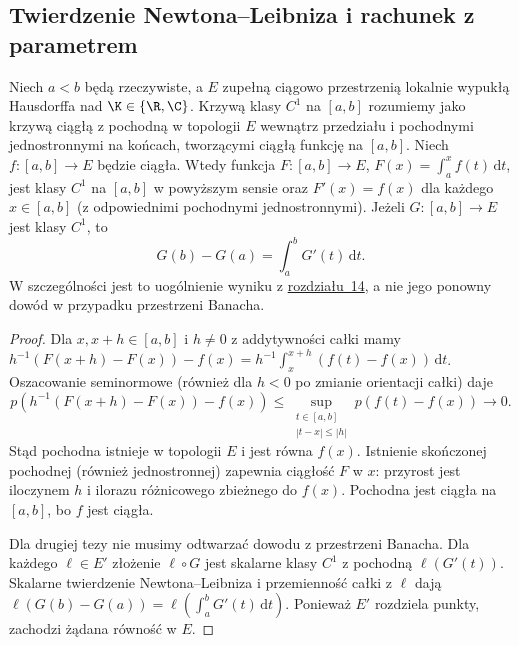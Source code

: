 \subsection{Twierdzenie Newtona--Leibniza i rachunek z parametrem}

\begin{twierdzenie}
\label{thm:ftc-lcs15a}
Niech $a<b$ będą rzeczywiste, a $E$ zupełną ciągowo
przestrzenią lokalnie wypukłą Hausdorffa nad $\K\in\{\R,\C\}$.
Krzywą klasy $C^1$ na $[a,b]$ rozumiemy jako krzywą ciągłą
z pochodną w topologii $E$ wewnątrz przedziału i pochodnymi
jednostronnymi na końcach, tworzącymi ciągłą funkcję
na $[a,b]$. Niech $f:[a,b]\to E$ będzie ciągła. Wtedy funkcja
$F:[a,b]\to E$, $F(x)=\int_a^x f(t)\,\mathrm dt$, jest klasy
$C^1$ na $[a,b]$ w powyższym sensie oraz
$F'(x)=f(x)$ dla każdego $x\in[a,b]$ (z odpowiednimi
pochodnymi jednostronnymi).
Jeżeli $G:[a,b]\to E$ jest klasy $C^1$, to
\[
 G(b)-G(a)=\int_a^b G'(t)\,\mathrm dt.
\]
W szczególności jest to uogólnienie wyniku z \hyperref[sec:gateaux-frechet14]{rozdziału~14},
a nie jego ponowny dowód w przypadku przestrzeni Banacha.
\end{twierdzenie}
\begin{proof}
Dla $x,x+h\in[a,b]$ i $h\ne0$ z addytywności całki mamy
$h^{-1}(F(x+h)-F(x))-f(x)
=h^{-1}\int_x^{x+h}(f(t)-f(x))\,\mathrm dt$.
Oszacowanie seminormowe (również dla $h<0$ po zmianie
orientacji całki) daje
\[
 p\left(h^{-1}(F(x+h)-F(x))-f(x)\right)
 \le\sup_{\substack{t\in[a,b]\\|t-x|\le|h|}}p(f(t)-f(x))
 \longrightarrow0.
\]
Stąd pochodna istnieje w topologii $E$ i jest równa $f(x)$.
Istnienie skończonej pochodnej (również jednostronnej)
zapewnia ciągłość $F$ w $x$: przyrost jest iloczynem $h$
i ilorazu różnicowego zbieżnego do $f(x)$.
Pochodna jest ciągła na $[a,b]$, bo $f$ jest ciągła.

Dla drugiej tezy nie musimy odtwarzać dowodu z przestrzeni Banacha.
Dla każdego $\ell\in E'$ złożenie $\ell\circ G$ jest skalarne
klasy $C^1$ z pochodną $\ell(G'(t))$. Skalarne twierdzenie
Newtona--Leibniza i przemienność całki z $\ell$ dają
$\ell(G(b)-G(a))=\ell(\int_a^b G'(t)\,\mathrm dt)$.
Ponieważ $E'$ rozdziela punkty, zachodzi żądana równość w $E$.
\end{proof}

